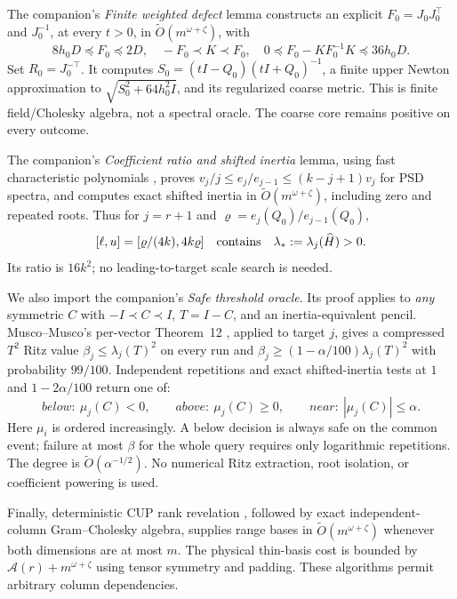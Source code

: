 \documentclass[11pt]{article}
\newcommand{\tO}{\widetilde O}
\newcommand{\Ac}{\mathcal A}
\begin{document}
The companion's \emph{Finite weighted defect} lemma constructs an
explicit \(F_0=J_0J_0^\top\) and \(J_0^{-1}\), at every \(t>0\),
in \(\tO(m^{\omega+\zeta})\), with
\begin{equation}\label{eq:base}
 8h_0D\preceq F_0\preceq2D,\quad -F_0\prec K\prec F_0,
 \quad0\preceq F_0-KF_0^{-1}K\preceq36h_0D.
\end{equation}
Set \(R_0=J_0^{-\top}\).
It computes \(S_0=(tI-Q_0)(tI+Q_0)^{-1}\), a finite upper Newton
approximation to \(\sqrt{S_0^2+64h_0^2I}\), and its regularized
coarse metric. This is finite field/Cholesky algebra, not a spectral
oracle. The coarse core remains positive on every outcome.

The companion's \emph{Coefficient ratio and shifted inertia} lemma,
using fast characteristic polynomials \cite{np}, proves
\(v_j/j\leq e_j/e_{j-1}\leq(k-j+1)v_j\) for PSD spectra, and
computes exact shifted inertia in \(\tO(m^{\omega+\zeta})\), including
zero and repeated roots. Thus for \(j=r+1\) and
\(\varrho=e_j(Q_0)/e_{j-1}(Q_0)\),
\begin{equation}\label{eq:init}
 [\ell,u]=[\varrho/(4k),4k\varrho]
 \quad\hbox{contains}\quad\lambda_*:=\lambda_j(\widehat H)>0.
\end{equation}
Its ratio is \(16k^2\); no leading-to-target scale search is needed.

We also import the companion's \emph{Safe threshold oracle}. Its proof
applies to \emph{any} symmetric \(C\) with \(-I\prec C\prec I\),
\(T=I-C\), and an inertia-equivalent pencil. Musco--Musco's per-vector
Theorem~12 \cite{mm}, applied to target \(j\), gives a compressed
\(T^2\) Ritz value \(\beta_j\leq\lambda_j(T)^2\) on every run and
\(\beta_j\geq(1-\alpha/100)\lambda_j(T)^2\) with probability
\(99/100\). Independent repetitions and exact shifted-inertia tests at
\(1\) and \(1-2\alpha/100\) return one of:
\[
 \textit{below}:\ \mu_j(C)<0,\qquad
 \textit{above}:\ \mu_j(C)\geq0,\qquad
 \textit{near}:\ |\mu_j(C)|\leq\alpha.
\]
Here \(\mu_i\) is ordered increasingly. A below decision is always safe
on the common event; failure at most \(\beta\) for the whole query
requires only logarithmic repetitions. The degree is
\(\tO(\alpha^{-1/2})\). No numerical Ritz extraction, root isolation,
or coefficient powering is used.

Finally, deterministic CUP rank revelation \cite{jps}, followed by
exact independent-column Gram--Cholesky algebra, supplies range bases
in \(\tO(m^{\omega+\zeta})\) whenever both dimensions are at most
\(m\). The physical thin-basis cost is bounded by
\(\Ac(r)+m^{\omega+\zeta}\) using tensor symmetry and padding.
These algorithms permit arbitrary column dependencies.
\end{document}
